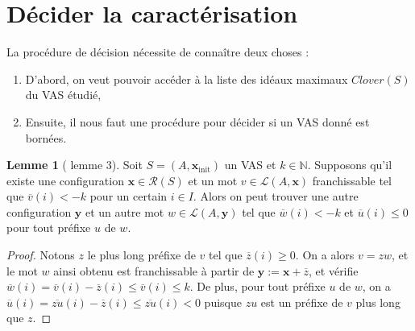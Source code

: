 \documentclass[a4paper,final]{article}
\theoremstyle{definition}
\newtheorem{Lemma}[Theorem]{Lemme}
\let\leq\leqslant
\let\geq\geqslant
\newcommand{\os}[1]{\left\{\mathinner{#1}\right\}}
\newcommand{\N}{\ensuremath{\mathbb{N}}}
\newcommand{\lang}{\ensuremath{\mathcal{L}}}
\newcommand{\reach}{\ensuremath{\mathcal{R}}}
\newcommand{\clover}{\textit{Clover}}
\newcommand{\vect}[1]{\ensuremath{\mathbf{#1}}}
\newcommand{\xinit}{\ensuremath{\vect{x}_\text{init}}}
\newcommand{\valeur}[1]{\ensuremath{\overline{#1}}}
\begin{document}


\section{Décider la caractérisation}

La procédure de décision nécessite de connaître deux choses :
\begin{enumerate}
    \item D'abord, on veut pouvoir accéder à la liste des idéaux maximaux $\clover(S)$ du VAS étudié,
    \item Ensuite, il nous faut une procédure pour décider si un VAS donné est bornées.
\end{enumerate}

\begin{Lemma}[\cite{giyo80} lemme 3]\label{mot décroissant}
    Soit $S=(A,\xinit)$ un VAS et $k\in\N$.
    Supposons qu'il existe une configuration $\vect{x}\in \reach(S)$ et un mot $v\in\lang(A,\vect{x})$ franchissable tel que $\valeur{v}(i) < -k$ pour un certain $i \in I$.
    Alors on peut trouver une autre configuration $\vect{y}$ et un autre mot $w\in\lang(A,\vect{y})$ tel que $\valeur{w}(i) < -k$ et $\valeur{u}(i) \leq 0$ pour tout préfixe $u$ de $w$.
\end{Lemma}

\begin{proof}
Notons $z$ le plus long préfixe de $v$ tel que $\valeur{z}(i) \geq 0$.
On a alors $v = zw$, et le mot $w$ ainsi obtenu est franchissable à partir de $\vect{y} := \vect{x} + \valeur{z}$, 
et vérifie $\valeur{w}(i) = \valeur{v}(i) - \valeur{z}(i) \leq \valeur{v}(i) \leq k$.
De plus, pour tout préfixe $u$ de $w$, on a $\valeur{u}(i) = \valeur{zu}(i) - \valeur{z}(i) \leq \valeur{zu}(i) < 0$ puisque $zu$ est un préfixe de $v$ plus long que $z$.
\end{proof}
\end{document}
